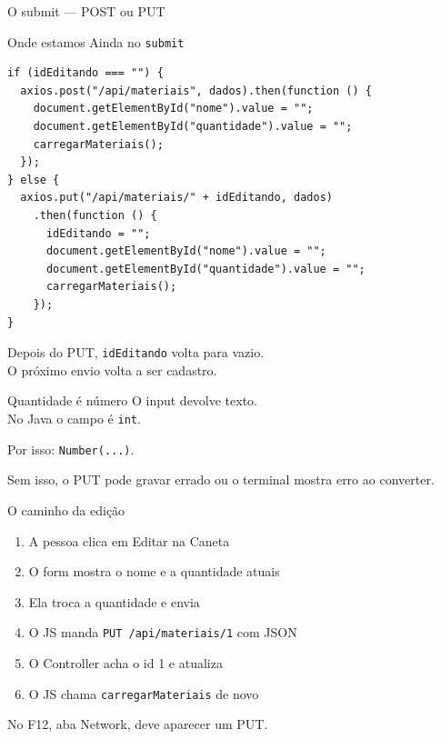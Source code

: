 \documentclass[aspectratio=169,11pt]{beamer}
\newcommand{\onde}[1]{%
  \begin{block}{Onde estamos}
    #1
  \end{block}
}
\begin{document}
\begin{frame}[fragile]{O submit --- POST ou PUT}
  \onde{Ainda no \texttt{submit}}

\begin{lstlisting}[basicstyle=\ttfamily\scriptsize]
if (idEditando === "") {
  axios.post("/api/materiais", dados).then(function () {
    document.getElementById("nome").value = "";
    document.getElementById("quantidade").value = "";
    carregarMateriais();
  });
} else {
  axios.put("/api/materiais/" + idEditando, dados)
    .then(function () {
      idEditando = "";
      document.getElementById("nome").value = "";
      document.getElementById("quantidade").value = "";
      carregarMateriais();
    });
}
\end{lstlisting}

  Depois do PUT, \texttt{idEditando} volta para vazio.\\
  O próximo envio volta a ser cadastro.
\end{frame}

\begin{frame}{Quantidade é número}
  O input devolve texto.\\
  No Java o campo é \texttt{int}.

  \vspace{0.5em}
  Por isso: \texttt{Number(...)}.

  \vspace{0.5em}
  Sem isso, o PUT pode gravar errado
  ou o terminal mostra erro ao converter.
\end{frame}

\begin{frame}{O caminho da edição}
  \begin{enumerate}
    \item A pessoa clica em Editar na Caneta
    \item O form mostra o nome e a quantidade atuais
    \item Ela troca a quantidade e envia
    \item O JS manda \texttt{PUT /api/materiais/1} com JSON
    \item O Controller acha o id 1 e atualiza
    \item O JS chama \texttt{carregarMateriais} de novo
  \end{enumerate}

  \vspace{0.5em}
  No F12, aba Network, deve aparecer um PUT.
\end{frame}
\end{document}
